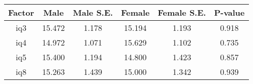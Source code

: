 \begin{longtable}{c c c c c c}
\toprule
\textbf{Factor} & \textbf{Male} & \textbf{Male S.E.}  & \textbf{Female} & \textbf{Female S.E.} & \textbf{P-value} \\
\midrule
iq3 & 15.472 & 1.178 &  15.194 & 1.193 & 0.918 \\
iq4 & 14.972 & 1.071 &  15.629 & 1.102 & 0.735 \\
iq5 & 15.400 & 1.194 &  14.800 & 1.423 & 0.857 \\
iq8 & 15.263 & 1.439 &  15.000 & 1.342 & 0.939 \\
\bottomrule
\end{longtable}

